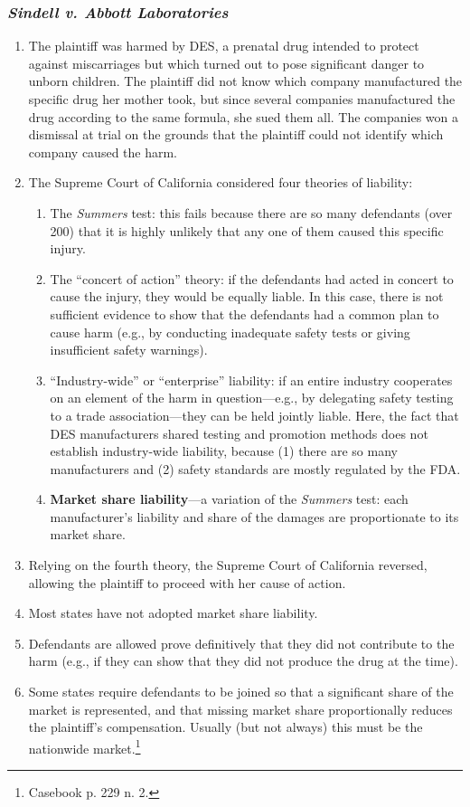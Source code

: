 \subsubsection{\emph{Sindell v. Abbott Laboratories}}

\begin{enumerate}
    \item The plaintiff was harmed by DES, a prenatal drug intended to protect against miscarriages but which turned out to pose significant danger to unborn children. The plaintiff did not know which company manufactured the specific drug her mother took, but since several companies manufactured the drug according to the same formula, she sued them all. The companies won a dismissal at trial on the grounds that the plaintiff could not identify which company caused the harm.
    \item The Supreme Court of California considered four theories of liability:
    \begin{enumerate}
        \item The \emph{Summers} test: this fails because there are so many defendants (over 200) that it is highly unlikely that any one of them caused this specific injury.
        \item The ``concert of action'' theory: if the defendants had acted in concert to cause the injury, they would be equally liable. In this case, there is not sufficient evidence to show that the defendants had a common plan to cause harm (e.g., by conducting inadequate safety tests or giving insufficient safety warnings).
        \item ``Industry-wide'' or ``enterprise'' liability: if an entire industry cooperates on an element of the harm in question---e.g., by delegating safety testing to a trade association---they can be held jointly liable. Here, the fact that DES manufacturers shared testing and promotion methods does not establish industry-wide liability, because (1) there are so many manufacturers and (2) safety standards are mostly regulated by the FDA.
        \item \textbf{Market share liability}---a variation of the \emph{Summers} test: each manufacturer's liability and share of the damages are proportionate to its market share.
    \end{enumerate}
    \item Relying on the fourth theory, the Supreme Court of California reversed, allowing the plaintiff to proceed with her cause of action.
    \item Most states have not adopted market share liability.
    \item Defendants are allowed prove definitively that they did not contribute to the harm (e.g., if they can show that they did not produce the drug at the time).
    \item Some states require defendants to be joined so that a significant share of the market is represented, and that missing market share proportionally reduces the plaintiff's compensation. Usually (but not always) this must be the nationwide market.\footnote{Casebook p. 229 n. 2.}
\end{enumerate}

